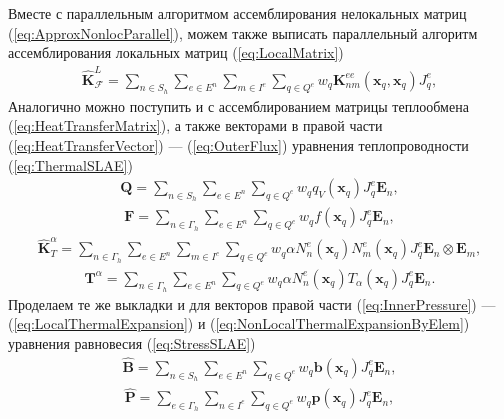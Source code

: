 Вместе с параллельным алгоритмом ассемблирования нелокальных матриц (\ref{eq:ApproxNonlocParallel}), можем также выписать параллельный алгоритм ассемблирования локальных матриц (\ref{eq:LocalMatrix})
\begin{gather*}
	\widehat{\textbf{K}}^L_{\mathcal{F}} =
	\sum\limits_{n \in S_h}
	\sum\limits_{e \in E^n}
	\sum\limits_{m \in I^e}
	\sum\limits_{q \in Q^e}
	w_q \textbf{K}^{ee}_{nm} (\boldsymbol{x}_q, \boldsymbol{x}_q) J_q^e,
\end{gather*}
Аналогично можно поступить и с ассемблированием матрицы теплообмена (\ref{eq:HeatTransferMatrix}), а также векторами в правой части (\ref{eq:HeatTransferVector}) --- (\ref{eq:OuterFlux}) уравнения теплопроводности (\ref{eq:ThermalSLAE})
\begin{gather*}
	\textbf{Q} =
	\sum\limits_{n \in S_h}
	\sum\limits_{e \in E^n}
	\sum\limits_{q \in Q^e}
	w_q q_V (\boldsymbol{x}_q) J_q^e \boldsymbol{E}_n,
\end{gather*}
\begin{gather*}
	\textbf{F} =
	\sum\limits_{n \in \Gamma_h}
	\sum\limits_{e \in E^n}
	\sum\limits_{q \in Q^e}
	w_q f (\boldsymbol{x}_q) J_q^e \boldsymbol{E}_n,
\end{gather*}
\begin{gather*}
	\widehat{\textbf{K}}^{\alpha}_T =
	\sum\limits_{n \in \Gamma_h}
	\sum\limits_{e \in E^n}
	\sum\limits_{m \in I^{e}}
	\sum\limits_{q \in Q^e}
	w_q \alpha N_n^e (\boldsymbol{x}_q) N_m^e (\boldsymbol{x}_q) J_q^e \boldsymbol{E}_n \otimes \boldsymbol{E}_m,
\end{gather*}
\begin{gather*}
	\textbf{T}^{\alpha} =
	\sum\limits_{n \in \Gamma_h}
	\sum\limits_{e \in E^n}
	\sum\limits_{q \in Q^e}
	w_q \alpha N_n^e (\boldsymbol{x}_q) T_{\alpha} (\boldsymbol{x}_q) J_q^e \boldsymbol{E}_n.
\end{gather*}
Проделаем те же выкладки и для векторов правой части (\ref{eq:InnerPressure}) --- (\ref{eq:LocalThermalExpansion}) и (\ref{eq:NonLocalThermalExpansionByElem}) уравнения равновесия (\ref{eq:StressSLAE})
\begin{gather*}
	\widehat{\textbf{B}} =
	\sum\limits_{n \in S_h}
	\sum\limits_{e \in E^n}
	\sum\limits_{q \in Q^e}
	w_q \boldsymbol{b} (\boldsymbol{x}_q) J_q^e \boldsymbol{E}_n,
\end{gather*}
\begin{gather*}
	\widehat{\textbf{P}} = 
	\sum\limits_{e \in \Gamma_h}
	\sum\limits_{n \in I^e}
	\sum\limits_{q \in Q^e}
	w_q \boldsymbol{p} (\boldsymbol{x}_q) J_q^e \boldsymbol{E}_n,
\end{gather*}
